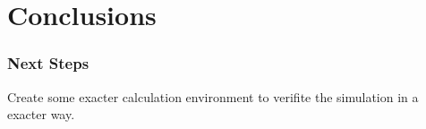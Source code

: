 
\chapter{Conclusions}


\subsection{Next Steps}

Create some exacter calculation environment to verifite the simulation in a exacter way.